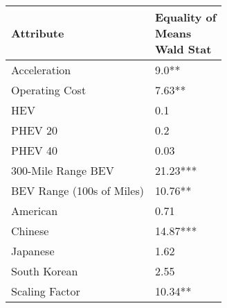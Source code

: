 \begin{tabular}{ll}
\toprule
                Attribute & \makecell{Equality of \\ Means \\ Wald Stat} \\
\midrule
             Acceleration &                       \multirow{1}{*}{9.0**} \\
           Operating Cost &                      \multirow{1}{*}{7.63**} \\
                      HEV &                         \multirow{1}{*}{0.1} \\
                  PHEV 20 &                         \multirow{1}{*}{0.2} \\
                  PHEV 40 &                        \multirow{1}{*}{0.03} \\
       300-Mile Range BEV &                    \multirow{1}{*}{21.23***} \\
BEV Range (100s of Miles) &                     \multirow{1}{*}{10.76**} \\
                 American &                        \multirow{1}{*}{0.71} \\
                  Chinese &                    \multirow{1}{*}{14.87***} \\
                 Japanese &                        \multirow{1}{*}{1.62} \\
             South Korean &                        \multirow{1}{*}{2.55} \\
           Scaling Factor &                     \multirow{1}{*}{10.34**} \\
\bottomrule
\end{tabular}
